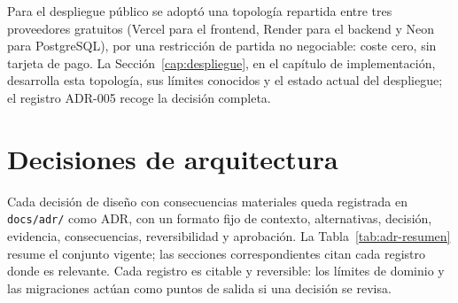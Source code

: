 Para el despliegue público se adoptó una topología repartida entre tres proveedores
gratuitos (Vercel para el frontend, Render para el backend y Neon para PostgreSQL), por una
restricción de partida no negociable: coste cero, sin tarjeta de pago. La
Sección~\ref{cap:despliegue}, en el capítulo de implementación, desarrolla esta topología,
sus límites conocidos y el estado actual del despliegue; el registro ADR-005 recoge la
decisión completa.

\section{Decisiones de arquitectura}\label{sec:dis-adr}

Cada decisión de diseño con consecuencias materiales queda registrada en \texttt{docs/adr/}
como ADR, con un formato fijo de contexto, alternativas,
decisión, evidencia, consecuencias, reversibilidad y aprobación. La
Tabla~\ref{tab:adr-resumen} resume el conjunto vigente; las secciones correspondientes citan
cada registro donde es relevante. Cada registro es citable y reversible: los límites de dominio
y las migraciones actúan como puntos de salida si una decisión se revisa.

